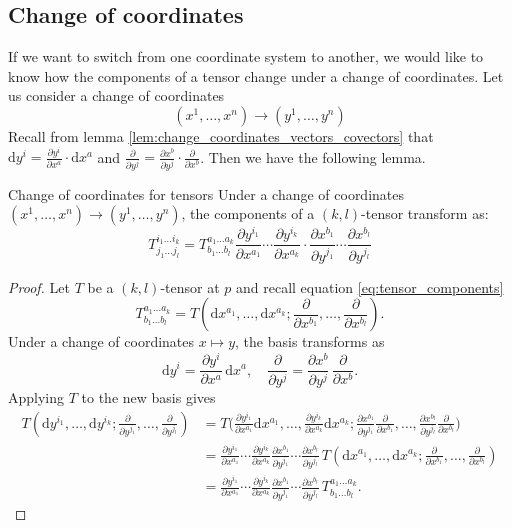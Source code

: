 \subsection{Change of coordinates}

If we want to switch from one coordinate system to another, we would like to know how the components of a tensor change under a change of coordinates. Let us consider a change of coordinates
\[
(x^1, \dots, x^n) \longrightarrow (y^1, \dots, y^n)
\]
Recall from lemma \ref{lem:change_coordinates_vectors_covectors} that $\mathrm{d}y^i = \frac{\partial y^i}{\partial x^a}\cdot \mathrm{d}x^a$ and $\frac{\partial}{\partial y^j} = \frac{\partial x^b}{\partial y^j} \cdot \frac{\partial}{\partial x^b}$. Then we have the following lemma.

\begin{colorlem}{Change of coordinates for tensors}{}
Under a change of coordinates $(x^1, \dots, x^n) \longrightarrow (y^1, \dots, y^n)$, the components of a $(k,l)$-tensor transform as:
\[
T^{i_1 \dots i_k}_{j_1 \dots j_l} = T^{a_1 \dots a_k}_{b_1 \dots b_l} \frac{\partial y^{i_1}}{\partial x^{a_1}} \cdots \frac{\partial y^{i_k}}{\partial x^{a_k}} \cdot \frac{\partial x^{b_1}}{\partial y^{j_1}} \cdots \frac{\partial x^{b_l}}{\partial y^{j_l}}
\]
\end{colorlem}

\begin{proof}
Let \(T\) be a \((k,l)\)-tensor at \(p\) and recall equation \eqref{eq:tensor_components}
\[
T^{a_1 \dots a_k}_{b_1 \dots b_l} = T(\mathrm{d}x^{a_1}, \dots, \mathrm{d}x^{a_k}; \frac{\partial}{\partial x^{b_1}}, \dots, \frac{\partial}{\partial x^{b_l}}).
\]
Under a change of coordinates \(x \mapsto y\), the basis transforms as
\[
\mathrm{d}y^{i} = \frac{\partial y^i}{\partial x^a} \, \mathrm{d}x^a, \quad
\frac{\partial}{\partial y^j} = \frac{\partial x^b}{\partial y^j} \, \frac{\partial}{\partial x^b}.
\]
Applying \(T\) to the new basis gives
\[
\begin{aligned}
T(\mathrm{d}y^{i_1}, \dots, \mathrm{d}y^{i_k}; \frac{\partial}{\partial y^{j_1}}, \dots, \frac{\partial}{\partial y^{j_l}})
&= T\Big(\frac{\partial y^{i_1}}{\partial x^{a_1}} \mathrm{d}x^{a_1}, \dots, \frac{\partial y^{i_k}}{\partial x^{a_k}} \mathrm{d}x^{a_k}; \frac{\partial x^{b_1}}{\partial y^{j_1}} \frac{\partial}{\partial x^{b_1}}, \dots, \frac{\partial x^{b_l}}{\partial y^{j_l}} \frac{\partial}{\partial x^{b_l}}\Big) \\
&= \frac{\partial y^{i_1}}{\partial x^{a_1}} \cdots \frac{\partial y^{i_k}}{\partial x^{a_k}} \frac{\partial x^{b_1}}{\partial y^{j_1}} \cdots \frac{\partial x^{b_l}}{\partial y^{j_l}} \, T(\mathrm{d}x^{a_1}, \dots, \mathrm{d}x^{a_k}; \frac{\partial}{\partial x^{b_1}}, \dots, \frac{\partial}{\partial x^{b_l}}) \\
&= \frac{\partial y^{i_1}}{\partial x^{a_1}} \cdots \frac{\partial y^{i_k}}{\partial x^{a_k}} \frac{\partial x^{b_1}}{\partial y^{j_1}} \cdots \frac{\partial x^{b_l}}{\partial y^{j_l}} \, T^{a_1 \dots a_k}_{b_1 \dots b_l}.
\end{aligned}
\]
\end{proof}

